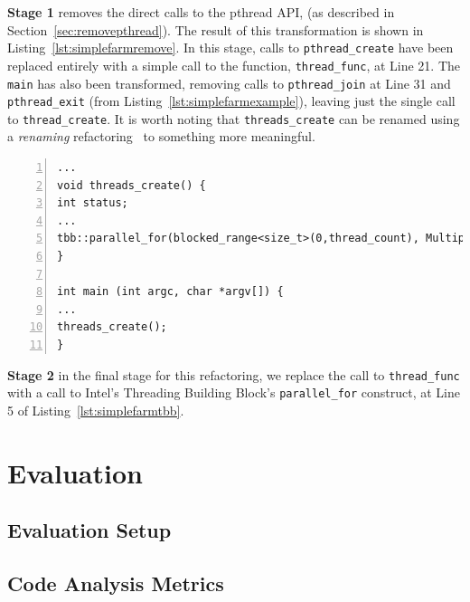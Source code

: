 \noindent
\textbf{Stage 1} removes the direct calls to the pthread API, (as described in Section~\ref{sec:removepthread}). The result of this transformation is shown in Listing~\ref{lst:simplefarmremove}. In this stage, calls to \lstinline{pthread_create} have been replaced entirely with a simple call to the function, \lstinline{thread_func}, at Line 21. The \lstinline{main} has also been transformed, removing calls to \lstinline{pthread_join} at Line 31 and \lstinline{pthread_exit} (from Listing~\ref{lst:simplefarmexample}), leaving just the single call to \lstinline{thread_create}. It is worth noting that \lstinline{threads_create} can be renamed using a \emph{renaming} refactoring~\cite{opdyke} to something more meaningful. 

\begin{lstlisting}[frame=single,numbers=left,label=lst:simplefarmtbb,caption={Simple farm example, based on Matrix Multiplication, with tbb added.}]
...
void threads_create() {
int status;
...
tbb::parallel_for(blocked_range<size_t>(0,thread_count), MultiplyRowsMatrixTBB(a, b, res, chunk_size, extra_pool));
}

int main (int argc, char *argv[]) {
...
threads_create();
}
\end{lstlisting}

\noindent
\textbf{Stage 2} in the final stage for this refactoring, we replace the call to \lstinline{thread_func} with a call to Intel's Threading Building Block's \lstinline{parallel_for} construct, at Line 5 of Listing~\ref{lst:simplefarmtbb}.

\section{Evaluation}
\subsection{Evaluation Setup}

\subsection{Code Analysis Metrics}

